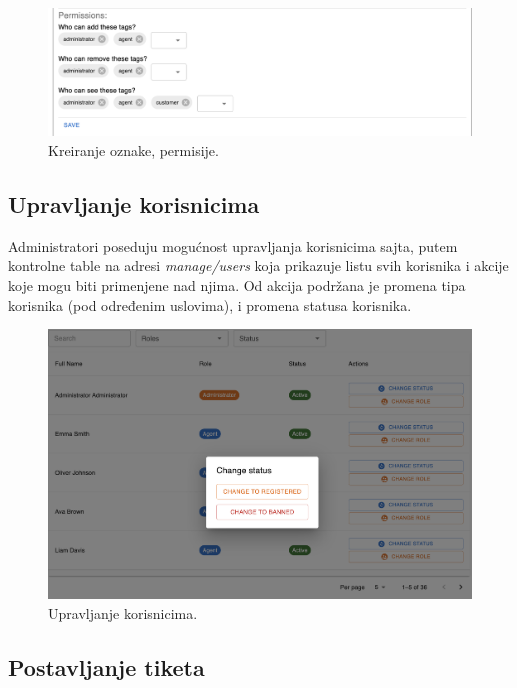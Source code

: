 \documentclass[12pt,oneside]{memoir}
\begin{document}
\begin{figure}[h]
  \centering
  \includegraphics[width=1\textwidth]{docs/images/ch_1/tag-mgmt-permissions.png} 
  \caption{Kreiranje oznake, permisije.}
\end{figure}

\newpage
\subsection{Upravljanje korisnicima}

Administratori poseduju mogućnost upravljanja korisnicima sajta, putem kontrolne table na adresi \textit{manage/users} koja prikazuje listu svih korisnika i akcije koje mogu biti primenjene nad njima. Od akcija podržana je promena tipa korisnika (pod određenim uslovima), i promena statusa korisnika.

\begin{figure}[h]
  \centering
  \includegraphics[width=1\textwidth]{docs/images/ch_1/manage-users-preview.png} 
  \caption{Upravljanje korisnicima.}
\end{figure}

\newpage
\subsection{Postavljanje tiketa}
\end{document}
